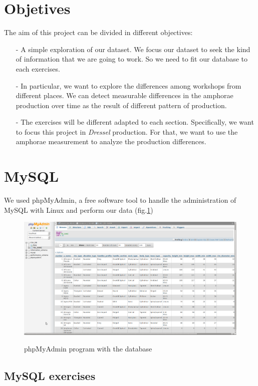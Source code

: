 \documentclass[10pt,a4paper]{article}
\begin{document}
\section{Objetives}

The aim of this project can be divided in different objectives: 

\begin{itemize}
\item[-] A simple exploration of our dataset. We focus our dataset to seek the kind of information that we are going to work. So we need to fit our database to each exercises. 
\item[-] In particular, we want to explore the differences among workshops from different places. We can detect measurable differences in the amphorae production over time as the result of different pattern of production. 
\item[-] The exercises will be different adapted to each section. Specifically, we want to focus this project in \textit{Dressel} production. For that, we want to use the amphorae measurement to analyze the production differences. 
\end{itemize}


\section{MySQL}

We used phpMyAdmin, a free software tool to handle the administration of MySQL  with Linux and perform our data (fig.\ref{myphp})

\begin{figure}[hdp]
	\centering
\includegraphics[scale=0.25]{picture2.png}
\label{myphp}
\caption{phpMyAdmin program with the database}
\end{figure} 

\subsection{MySQL exercises}
\end{document}
